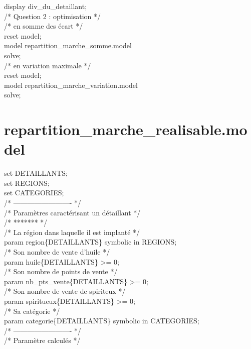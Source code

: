 \documentclass[a4paper,12pt,oneside]{report}
\begin{document}
display div\_du\_detaillant;\\


/* Question 2 : optimisation */\\

/* en somme des écart */\\
reset model;\\
model repartition\_marche\_somme.model\\
solve;\\

/* en variation maximale */\\
reset model;\\
model repartition\_marche\_variation.model\\
solve;\\

\chapter{repartition\_marche\_realisable.model}
set DETAILLANTS;\\
set REGIONS;\\
set CATEGORIES;\\

/* ------------------------- */\\
/* Paramètres caractérisant un détaillant */\\

/* ******* */\\
/* La région dans laquelle il est implanté */\\
param region\{DETAILLANTS\} symbolic in REGIONS;\\

/* Son nombre de vente d'huile */\\
param huile\{DETAILLANTS\} >= 0;\\

/* Son nombre de points de vente */\\
param nb\_pts\_vente\{DETAILLANTS\} >= 0;\\

/* Son nombre de vente de spiriteux */\\
param spiritueux\{DETAILLANTS\} >= 0;\\

/* Sa catégorie */\\
param categorie\{DETAILLANTS\} symbolic in CATEGORIES;\\

/* ------------------------- */\\
/* Paramètre calculés */\\
\end{document}
